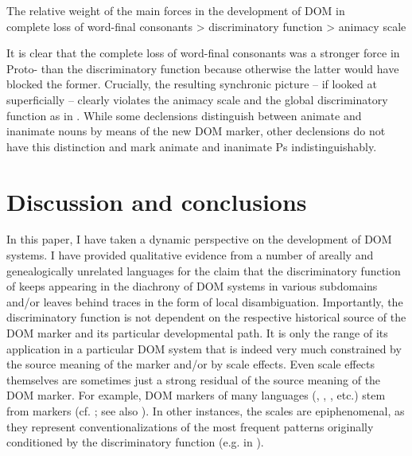 \documentclass[output=paper]{langsci/langscibook}
\begin{document}
\ea\label{ex:serzant:29}
The relative weight of the main forces in the development of DOM in \\
complete loss of word-final consonants > discriminatory function > animacy scale\\
\z

\noindent It is clear that the complete loss of word-final consonants was a stronger force in Proto- than the discriminatory function because otherwise the latter would have blocked the former. Crucially, the resulting synchronic picture – if looked at superficially – clearly violates the animacy scale and the global discriminatory function as in . While some declensions distinguish between animate and inanimate nouns by means of the new DOM marker, other declensions do not have this distinction and mark animate and inanimate Ps indistinguishably. 

\section{Discussion and conclusions}\label{sec:serzant:4}

In this paper, I have taken a dynamic perspective on the development of DOM systems. I have provided qualitative evidence from a number of areally and genealogically unrelated languages for the claim that the discriminatory function of  keeps appearing in the diachrony of DOM systems in various subdomains and/or leaves behind traces in the form of local disambiguation. Importantly, the discriminatory function is not dependent on the respective historical source of the DOM marker and its particular developmental path. It is only the range of its application in a particular DOM system that is indeed very much constrained by the source meaning of the marker and/or by scale effects. Even scale effects themselves are sometimes just a strong residual of the source meaning of the DOM marker. For example, DOM markers of many languages (, , , etc.) stem from  markers (cf. \citealt{Iemmolo2010,DalrympleNikolaeva2011}; see also ). In other instances, the scales are epiphenomenal, as they represent conventionalizations of the most frequent patterns originally conditioned by the discriminatory function (e.g. in ).
\end{document}
